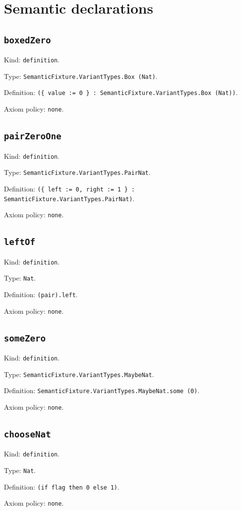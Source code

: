 \documentclass[11pt]{article}
\begin{document}
\section*{Semantic declarations}
\subsection*{\texttt{boxedZero}}
\noindent Kind: \texttt{definition}.\par
\noindent Type: \texttt{SemanticFixture.VariantTypes.Box (Nat)}.\par
\noindent Definition: \texttt{(\{ value := 0 \} : SemanticFixture.VariantTypes.Box (Nat))}.\par
\noindent Axiom policy: \texttt{none}.\par
\subsection*{\texttt{pairZeroOne}}
\noindent Kind: \texttt{definition}.\par
\noindent Type: \texttt{SemanticFixture.VariantTypes.PairNat}.\par
\noindent Definition: \texttt{(\{ left := 0, right := 1 \} : SemanticFixture.VariantTypes.PairNat)}.\par
\noindent Axiom policy: \texttt{none}.\par
\subsection*{\texttt{leftOf}}
\noindent Kind: \texttt{definition}.\par
\noindent Type: \texttt{Nat}.\par
\noindent Definition: \texttt{(pair).left}.\par
\noindent Axiom policy: \texttt{none}.\par
\subsection*{\texttt{someZero}}
\noindent Kind: \texttt{definition}.\par
\noindent Type: \texttt{SemanticFixture.VariantTypes.MaybeNat}.\par
\noindent Definition: \texttt{SemanticFixture.VariantTypes.MaybeNat.some (0)}.\par
\noindent Axiom policy: \texttt{none}.\par
\subsection*{\texttt{chooseNat}}
\noindent Kind: \texttt{definition}.\par
\noindent Type: \texttt{Nat}.\par
\noindent Definition: \texttt{(if flag then 0 else 1)}.\par
\noindent Axiom policy: \texttt{none}.\par
\end{document}
